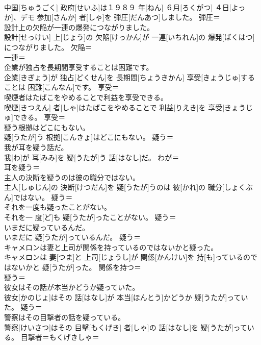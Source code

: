 \documentclass[8pt]{extreport}
\begin{document}
\begin{CJK}{UTF8}{min}
\\	中国[ちゅうごく] 政府[せいふ]は１９８９ 年[ねん] ６月[ろくがつ] ４日[よっか]、デモ 参加[さんか] 者[しゃ]を 弾圧[だんあつ]しました。	弾圧＝ 
\\	設計上の欠陥が一連の爆発につながりました。	
\\	設計[せっけい] 上[じょう]の 欠陥[けっかん]が 一連[いちれん]の 爆発[ばくはつ]につながりました。	欠陥＝ 
\\	一連＝ 
\\	企業が独占を長期間享受することは困難です。	
\\	企業[きぎょう]が 独占[どくせん]を 長期間[ちょうきかん] 享受[きょうじゅ]することは 困難[こんなん]です。	享受＝ 
\\	喫煙者はたばこをやめることで利益を享受できる。	
\\	喫煙[きつえん] 者[しゃ]はたばこをやめることで 利益[りえき]を 享受[きょうじゅ]できる。	享受＝ 
\\	疑う根拠はどこにもない。	
\\	疑[うたが]う 根拠[こんきょ]はどこにもない。	疑う＝ 
\\	我が耳を疑う話だ。	
\\	我[わ]が 耳[みみ]を 疑[うたが]う 話[はなし]だ。	わが＝ 
\\	耳を疑う＝ 
\\	主人の決断を疑うのは彼の職分ではない。	
\\	主人[しゅじん]の 決断[けつだん]を 疑[うたが]うのは 彼[かれ]の 職分[しょくぶん]ではない。	疑う＝ 
\\	それを一度も疑ったことがない。	
\\	それを一 度[ど]も 疑[うたが]ったことがない。	疑う＝ 
\\	いまだに疑っているんだ。	
\\	いまだに 疑[うたが]っているんだ。	疑う＝ 
\\	キャメロンは妻と上司が関係を持っているのではないかと疑った。	
\\	キャメロンは 妻[つま]と 上司[じょうし]が 関係[かんけい]を 持[も]っているのではないかと 疑[うたが]った。	関係を持つ＝ 
\\	疑う＝ 
\\	彼女はその話が本当かどうか疑っていた。	
\\	彼女[かのじょ]はその 話[はなし]が 本当[ほんとう]かどうか 疑[うたが]っていた。	疑う＝ 
\\	警察はその目撃者の話を疑っている。	
\\	警察[けいさつ]はその 目撃[もくげき] 者[しゃ]の 話[はなし]を 疑[うたが]っている。	目撃者＝もくげきしゃ＝ 

\end{CJK}
\end{document}
